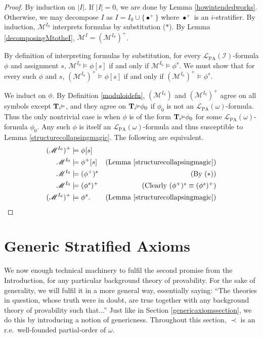 \documentclass[reqno]{article}
\theoremstyle{definition}
\def\L{\mathscr{L}}
\def\M{\mathscr{M}}
\def\T{\mathbf{T}}
\def\LPA{\L_{\mathrm{PA}}}
\def\indset{\mathcal I}
\renewcommand{\Pr}[1]{\T_{#1}\mbox{\small${\vDash}$}}
\begin{document}
\begin{proof}
By induction on $|I|$.
If $|I|=0$, we are done by Lemma \ref{howintendedworks}.
Otherwise, we may decompose $I$ as $I=I_0\cup\{\bullet^+\}$
where $\bullet^+$ is an $i$-stratifier.
By induction, $\M^{I_0}$ interprets formulas by substitution ($*$).
By Lemma \ref{decomposingMtotheI}, $\M^I=(\M^{I_0})^+$.

By definition of interpreting formulas by substitution,
for every $\LPA(\indset)$-formula $\phi$ and assignment $s$,
$\M^{I_0}\models\phi[s]$ if and only if $\M^{I_0}\models\phi^s$.
We must show that for every such $\phi$ and $s$, $(\M^{I_0})^+\models\phi[s]$ if and only
if $(\M^{I_0})^+\models\phi^s$.

We induct on $\phi$.
By Definition \ref{moduloidefn}, $(\M^{I_0})$ and $(\M^{I_0})^+$ agree on all symbols
except $\Pr i$, and they agree on $\Pr i \phi_0$ if $\phi_0$ is not an
$\LPA(\omega)$-formula.
Thus the only nontrivial case is when $\phi$
is of the form $\Pr i\phi_0$ for some $\LPA(\omega)$-formula $\phi_0$.
Any such $\phi$ is itself an $\LPA(\omega)$-formula and thus susceptible to
Lemma \ref{structurecollapsingmagic}.  The following are equivalent.
\begin{align*}
(\M^{I_0})^+ &\models \phi[s]\\
\M^{I_0} &\models \phi^+[s]
  &\mbox{(Lemma \ref{structurecollapsingmagic})}\\
\M^{I_0} &\models (\phi^+)^s
  &\mbox{(By ($*$))}\\
\M^{I_0} &\models (\phi^s)^+
  &\mbox{(Clearly $(\phi^+)^s\equiv(\phi^s)^+$)}\\
(\M^{I_0})^+ &\models \phi^s.
  &\mbox{(Lemma \ref{structurecollapsingmagic})}
\end{align*}
\end{proof}

\section{Generic Stratified Axioms}

We now enough technical machinery to fulfil the second promise from the
Introduction, for any particular background theory of provability.
For the sake of generality, we will fulfil it in a more general
way, essentially saying: ``The theories in question, whose
truth were in doubt, are true together with any background theory of
provability such that...'' Just like in Section \ref{genericaxiomssection},
we do this by introducing a notion of genericness.
Throughout this section, $\prec$ is an r.e.\ well-founded partial-order
of $\omega$.
\end{document}
